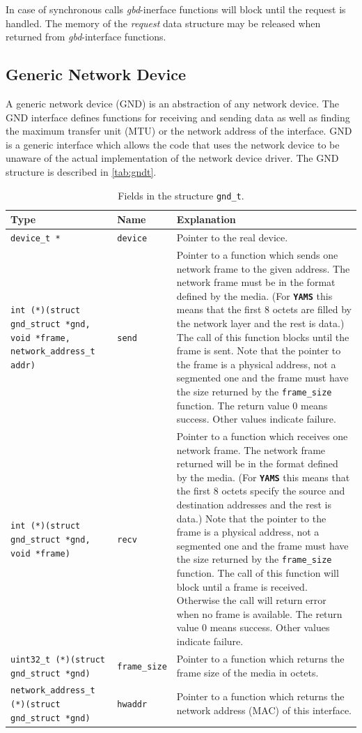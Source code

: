 \documentclass[twoside,a4paper]{report}
\newcommand{\PBS}[1]{\let\temp=\\#1\let\\=\temp}
\newlength{\tablewidth}
\newenvironment{structdescription}{%
\begin{center}%
\begin{tabular}{p{3.5cm}|p{2.5cm}|>{\PBS\raggedright}p{\tablewidth-6\tabcolsep-6cm}}%
\textbf{Type} & \textbf{Name} & \textbf{Explanation} \\ %
}{%
\end{tabular}%
\end{center}%
}
\newcommand{\structfield}[3]{%
\hline%
\texttt{#1} & \texttt{#2} & #3 \\%
}
\newcommand{\yams}{\texttt{\textbf{YAMS}}}
\begin{document}
In case of synchronous calls \emph{gbd}-inerface functions will block
until the request is handled. The memory of the \emph{request} data
structure may be released when returned from \emph{gbd}-interface
functions.


\subsection{Generic Network Device}
\label{sec:gnd}

A generic network device (GND) is an abstraction of any network
device. The GND interface defines functions for receiving and sending
data as well as finding the maximum transfer unit (MTU) or the network
address of the interface. GND is a generic interface which allows the
code that uses the network device to be unaware of the actual
implementation of the network device driver. The GND structure is
described in \autoref{tab:gndt}. 

\begin{table}
\begin{structdescription}

\structfield{device\_t *}{device}{Pointer to the real device.}

\structfield{int (*)(struct gnd\_struct *gnd, void *frame,
network\_address\_t addr)}{send}{Pointer to a function which sends one
network frame to the given address. The network frame must be in the
format defined by the media. (For \yams{} this means that the first 8
octets are filled by the network layer and the rest is data.) The call
of this function blocks until the frame is sent. Note that the pointer
to the frame is a physical address, not a segmented one and the frame
must have the size returned by the \texttt{frame\_size} function. The
return value 0 means success. Other values indicate failure.}

\structfield{int (*)(struct gnd\_struct *gnd, void
*frame)}{recv}{Pointer to a function which receives one network frame.
The network frame returned will be in the format defined by the media.
(For \yams{} this means that the first 8 octets specify the source and
destination addresses and the rest is data.) Note that the pointer to
the frame is a physical address, not a segmented one and the frame
must have the size returned by the \texttt{frame\_size} function. The
call of this function will block until a frame is received. Otherwise
the call will return error when no frame is available. The return
value 0 means success. Other values indicate failure.}

\structfield{uint32\_t (*)(struct gnd\_struct
  *gnd)}{frame\_size}{Pointer to a function which returns the frame
  size of the media in octets.}

\structfield{network\_address\_t (*)(struct gnd\_struct
*gnd)}{hwaddr}{Pointer to a function which returns the network address
(MAC) of this interface.}

\end{structdescription}
\caption{Fields in the structure \texttt{gnd\_t}.}
\label{tab:gndt}
\end{table}
\end{document}
